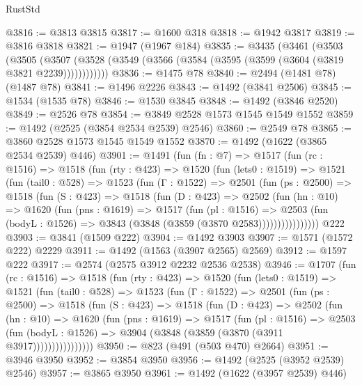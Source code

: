 \begin{lexlean}{RustStd}
\begin{coremodule}
{\begin{coremodule}
{{{{{{{{{{{{{@3816 := @3813 @3815
@3817 := @1600 @318
@3818 := @1942 @3817
@3819 := @3816 @3818
@3821 := @1947 (@1967 @184)
@3835 := @3435
    (@3461
      (@3503
        (@3505
          (@3507 (@3528 (@3549 (@3566 (@3584 (@3595 (@3599 (@3604 (@3819 @3821 @2239))))))))))))
@3836 := @1475 @78
@3840 := @2494 (@1481 @78) (@1487 @78)
@3841 := @1496 @2226
@3843 := @1492 (@3841 @2506)
@3845 := @1534 (@1535 @78)
@3846 := @1530 @3845
@3848 := @1492 (@3846 @2520)
@3849 := @2526 @78
@3854 := @3849 @2528 @1573 @1545 @1549 @1552
@3859 := @1492 (@2525 (@3854 @2534 @2539) @2546)
@3860 := @2549 @78
@3865 := @3860 @2528 @1573 @1545 @1549 @1552
@3870 := @1492 (@1622 (@3865 @2534 @2539) @446)
@3901 := @1491
    (fun (fn : @7) =>
    @1517
      (fun (rc : @1516) =>
      @1518
        (fun (rty : @423) =>
        @1520
          (fun (lets0 : @1519) =>
          @1521
            (fun (tail0 : @528) =>
            @1523
              (fun (Γ : @1522) =>
              @2501
                (fun (ps : @2500) =>
                @1518
                  (fun (S : @423) =>
                  @1518
                    (fun (D : @423) =>
                    @2502
                      (fun (hn : @10) =>
                      @1620
                        (fun (pns : @1619) =>
                        @1517
                          (fun (pl : @1516) =>
                          @2503
                            (fun (bodyL : @1526) => @3843 (@3848 (@3859 (@3870 @2583))))))))))))))))
    @222
@3903 := @3841 (@1509 @222)
@3904 := @1492 @3903
@3907 := @1571 (@1572 @222) @2229
@3911 := @1492 (@1563 (@3907 @2565) @2569)
@3912 := @1597 @222
@3917 := @2574 (@2575 @3912 @2232 @2536 @2538)
@3946 := @1707
    (fun (rc : @1516) =>
    @1518
      (fun (rty : @423) =>
      @1520
        (fun (lets0 : @1519) =>
        @1521
          (fun (tail0 : @528) =>
          @1523
            (fun (Γ : @1522) =>
            @2501
              (fun (ps : @2500) =>
              @1518
                (fun (S : @423) =>
                @1518
                  (fun (D : @423) =>
                  @2502
                    (fun (hn : @10) =>
                    @1620
                      (fun (pns : @1619) =>
                      @1517
                        (fun (pl : @1516) =>
                        @2503
                          (fun (bodyL : @1526) =>
                          @3904 (@3848 (@3859 (@3870 (@3911 @3917))))))))))))))))
@3950 := @823 (@491 (@503 @470) @2664)
@3951 := @3946 @3950
@3952 := @3854 @3950
@3956 := @1492 (@2525 (@3952 @2539) @2546)
@3957 := @3865 @3950
@3961 := @1492 (@1622 (@3957 @2539) @446)
}}}}}}}}}}}}}
\end{coremodule}}
\end{coremodule}
\end{lexlean}
